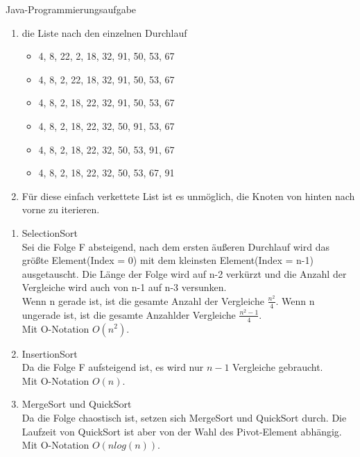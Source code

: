 \documentclass[12pt]{scrartcl}
\begin{document}
Java-Programmierungsaufgabe

\begin{enumerate}
  \item die Liste nach den einzelnen Durchlauf
    \begin{itemize}
      \item 4, 8, 22, 2, 18, 32, 91, 50, 53, 67
      \item 4, 8, 2, 22, 18, 32, 91, 50, 53, 67
      \item 4, 8, 2, 18, 22, 32, 91, 50, 53, 67
      \item 4, 8, 2, 18, 22, 32, 50, 91, 53, 67
      \item 4, 8, 2, 18, 22, 32, 50, 53, 91, 67
      \item 4, 8, 2, 18, 22, 32, 50, 53, 67, 91
    \end{itemize} 
  \item Für diese einfach verkettete List ist es unmöglich, die Knoten von hinten nach vorne zu iterieren.
\end{enumerate}

\begin{enumerate}
  \item SelectionSort\\
    Sei die Folge F absteigend, nach dem ersten äußeren Durchlauf wird das größte Element(Index = 0) mit dem kleinsten Element(Index = n-1) ausgetauscht.
    Die Länge der Folge wird auf n-2 verkürzt und die Anzahl der Vergleiche wird auch von n-1 auf n-3 versunken.\\
    Wenn n gerade ist, ist die gesamte Anzahl der Vergleiche $\frac{n^2}{4}$. Wenn n ungerade ist, ist die gesamte Anzahlder Vergleiche $\frac{n^2 -1 }{4}$.\\
    Mit O-Notation $O(n^2)$.
  \item InsertionSort\\
    Da die Folge F aufsteigend ist, es wird nur $n-1$ Vergleiche gebraucht.\\
    Mit O-Notation $O(n)$.
  \item MergeSort und QuickSort\\
    Da die Folge chaostisch ist, setzen sich MergeSort und QuickSort durch.
    Die Laufzeit von QuickSort ist aber von der Wahl des Pivot-Element abhängig.\\
    Mit O-Notation $O(nlog(n))$.
\end{enumerate}
\end{document}
